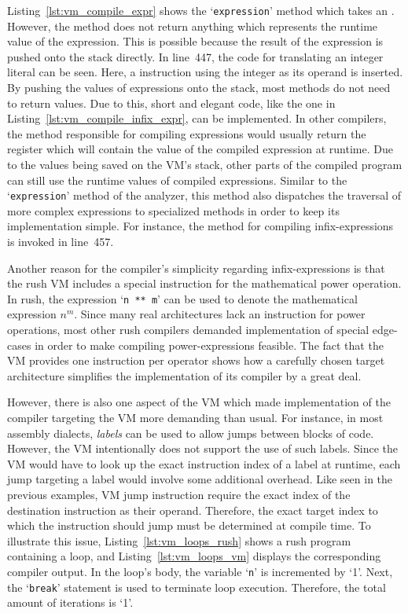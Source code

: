 Listing~\ref{lst:vm_compile_expr} shows the `\texttt{expression}' method which takes an .
However, the method does not return anything which represents the runtime value of the expression.
This is possible because the result of the expression is pushed onto the stack directly.
In line~447, the code for translating an integer literal can be seen.
Here, a  instruction using the integer as its operand is inserted.
By pushing the values of expressions onto the stack, most methods do not need to return values.
Due to this, short and elegant code, like the one in Listing~\ref{lst:vm_compile_infix_expr}, can be implemented.
In other compilers, the method responsible for compiling expressions would usually return the register which will contain the value of the compiled expression at runtime.
Due to the values being saved on the VM's stack, other parts of the compiled program can still use the runtime values of compiled expressions.
Similar to the `\texttt{expression}' method of the analyzer, this method also dispatches the traversal of more complex expressions to specialized methods in order to keep its implementation simple.
For instance, the method for compiling infix-expressions is invoked in line~457.

Another reason for the compiler's simplicity regarding infix-expressions is that the rush VM includes a special instruction for the mathematical power operation.
In rush, the expression `\texttt{n ** m}' can be used to denote the mathematical expression $n^m$.
Since many real architectures lack an instruction for power operations, most other rush compilers demanded implementation of special edge-cases in order to make compiling power-expressions feasible.
The fact that the VM provides one instruction per operator shows how a carefully chosen target architecture simplifies the implementation of its compiler by a great deal.

However, there is also one aspect of the VM which made implementation of the compiler targeting the VM more demanding than usual.
For instance, in most assembly dialects, \emph{labels} can be used to allow jumps between blocks of code.
However, the VM intentionally does not support the use of such labels.
Since the VM would have to look up the exact instruction index of a label at runtime, each jump targeting a label would involve some additional overhead.
Like seen in the previous examples, VM jump instruction require the exact index of the destination instruction as their operand.
Therefore, the exact target index to which the instruction should jump must be determined at compile time.
To illustrate this issue, Listing~\ref{lst:vm_loops_rush} shows a rush program containing a loop, and Listing~\ref{lst:vm_loops_vm} displays the corresponding compiler output.
In the loop's body, the variable `\texttt{n}' is incremented by `1'.
Next, the `\texttt{break}' statement is used to terminate loop execution.
Therefore, the total amount of iterations is `1'.

